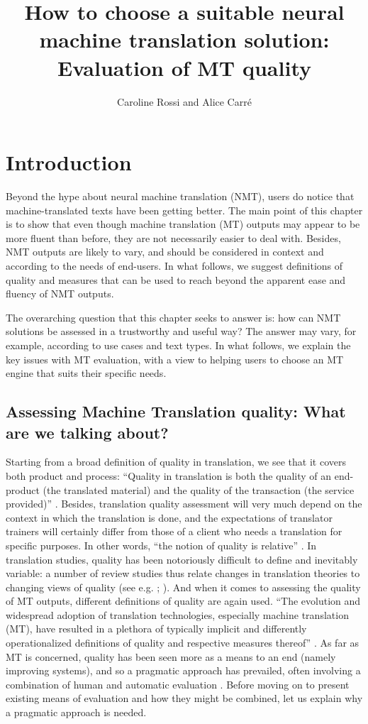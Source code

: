 \documentclass[output=paper]{langscibook}
\author{Caroline Rossi\affiliation{Université Grenoble-Alpes} and Alice Carré\affiliation{Université Grenoble-Alpes}}
\title[How to choose a suitable neural machine translation solution]
    {How to choose a suitable neural machine translation solution: Evaluation of MT quality}
\begin{document}
\maketitle


\section{Introduction}

Beyond the hype about neural machine translation (NMT), users do notice that machine-translated texts have been getting better. The main point of this chapter is to show that even though machine translation (MT) outputs may appear to be more fluent than before, they are not necessarily easier to deal with. Besides, NMT outputs are likely to vary, and should be considered in context and according to the needs of end-users. In what follows, we suggest definitions of quality and measures that can be used to reach beyond the apparent ease and fluency of NMT outputs.

The overarching question that this chapter seeks to answer is: how can NMT solutions be assessed in a trustworthy and useful way? The answer may vary, for example, according to use cases and text types. In what follows, we explain the key {issues} with MT {evaluation}, with a view to helping users to {choose} an MT engine that suits their specific needs.

\subsection{Assessing Machine Translation quality: What are we talking about?}

Starting from a broad definition of quality in translation, we see that it covers both product and process: “Quality in translation is both the quality of an end-product (the translated material) and the quality of the transaction (the service provided)” \citep[270]{Gouadec2010}. Besides, translation quality assessment will very much depend on the context in which the translation is done, and the expectations of translator trainers will certainly differ from those of a client who needs a translation for specific purposes. In other words, “the notion of quality is relative” \citep[232]{Grbić2008}. In translation studies, quality has been notoriously difficult to define and inevitably variable: a number of review studies thus relate changes in translation theories to changing views of quality (see e.g. \citealt{Drugan2013}; \citealt{House2015}). And when it comes to assessing the quality of MT outputs, different definitions of quality are again used.  “The evolution and widespread adoption of translation technologies, especially machine translation (MT), have resulted in a plethora of typically implicit and differently operationalized definitions of quality and respective measures thereof” \citep[131]{Doherty2017}. As far as MT is concerned, quality has been seen more as a means to an end (namely improving systems), and so a pragmatic approach has prevailed, often involving a combination of human and automatic evaluation \citep[133]{Doherty2017}. Before moving on to present existing means of evaluation and how they might be combined, let us explain why a pragmatic approach is needed.
\end{document}
